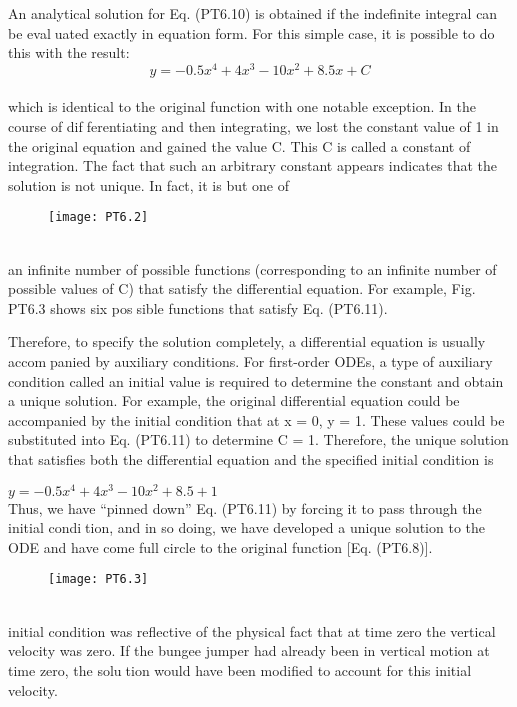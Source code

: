 An analytical solution for Eq. (PT6.10) is obtained if the indefinite integral can be evaluated exactly in equation form. For this simple case, it is possible to do this with the result:\\
\begin{equation}
\tag{PT6.11}
y=-0.5x^4 + 4x^3 - 10x^2 + 8.5x + C
\end{equation}\\
which is identical to the original function with one notable exception. In the course of differentiating and then integrating, we lost the constant value of 1 in the original equation
and gained the value C. This C is called a constant of integration. The fact that such an
arbitrary constant appears indicates that the solution is not unique. In fact, it is but one of\\
\pagebreak
\begin{figure}[hbt!]
	\texttt{[image: PT6.2]}
	\label{PT6.2}
\end{figure}\\
an infinite number of possible functions (corresponding to an infinite number of possible
values of C) that satisfy the differential equation. For example, Fig. PT6.3 shows six possible functions that satisfy Eq. (PT6.11).

Therefore, to specify the solution completely, a differential equation is usually accompanied by auxiliary conditions. For first-order ODEs, a type of auxiliary condition called
an initial value is required to determine the constant and obtain a unique solution. For
example, the original differential equation could be accompanied by the initial condition
that at x = 0, y = 1. These values could be substituted into Eq. (PT6.11) to determine
C = 1. Therefore, the unique solution that satisfies both the differential equation and the
specified initial condition is

$y=-0.5x^4 + 4x^3 - 10x^2 + 8.5 + 1$\\
Thus, we have “pinned down” Eq. (PT6.11) by forcing it to pass through the initial condition, and in so doing, we have developed a unique solution to the ODE and have come full
circle to the original function [Eq. (PT6.8)].\\
\begin{figure}[hbt!]
	\texttt{[image: PT6.3]}
	\label{PT6.3}
\end{figure}\\
initial condition was reflective of the physical fact that at time zero the vertical velocity
was zero. If the bungee jumper had already been in vertical motion at time zero, the solution would have been modified to account for this initial velocity.

